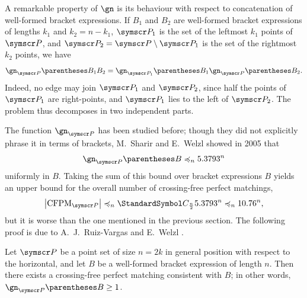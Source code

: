 A remarkable property of $\gn$ is its behaviour with respect to concatenation of well-formed bracket expressions.
If $B_1$ and $B_2$ are well-formed bracket expressions of lengths $k_1$ and $k_2=n-k_1$,
$\pointset P_1$ is the set of the leftmost $k_1$ points of $\pointset P$, and
$\pointset P_2=\pointset P\setminus\pointset P_1$ is the set of the
rightmost $k_2$ points, we have\[
\gn_{\pointset P}\of{B_1B_2}=\gn_{\pointset P_1}\of{B_1}\gn_{\pointset P}\of{B_2}\text.
\]
Indeed, no edge may join $\pointset P_1$ and $\pointset P_2$, since half the points of $\pointset P_1$ are right-points,
and $\pointset P_1$ lies to the left of $\pointset P_2$. The problem thus decomposes in two independent parts.

The function $\gn_{\pointset P}$ has been studied before; though they did not explicitly phrase it in terms of brackets,
M.~Sharir and E.~Welzl showed in 2005 \cite{SharirWelzl2006} that\begin{equation}
\gn_{\pointset P}\of B\preccurlyeq_n5.3793^n
\label{boundOnLeftRightPerfectMatchings}
\end{equation}
uniformly in $B$. Taking the sum of this bound over bracket expressions $B$ yields an upper bound for the overall number of
crossing-free perfect matchings,\[
\Cardinality{\CFPM_{\pointset P}}
\preccurlyeq_n \CatalanNumber {\frac n 2} 5.3793^n
\preccurlyeq_n 10.76^n\text,
\]
but it is worse than the one mentioned in the previous section.
The following proof is due to A.~J.~Ruiz-Vargas and E.~Welzl \cite{RuizVargasWelzl2016}.
\begin{theorem}
Let $\pointset P$ be a point set of size $n = 2k$ in general position with respect to the horizontal,
and let $B$ be a well-formed bracket expression of length $n$.
Then there exists a crossing-free perfect matching consistent with $B$; in other words,
$\gn_{\pointset P}\of B \geq 1$.
\end{theorem}
